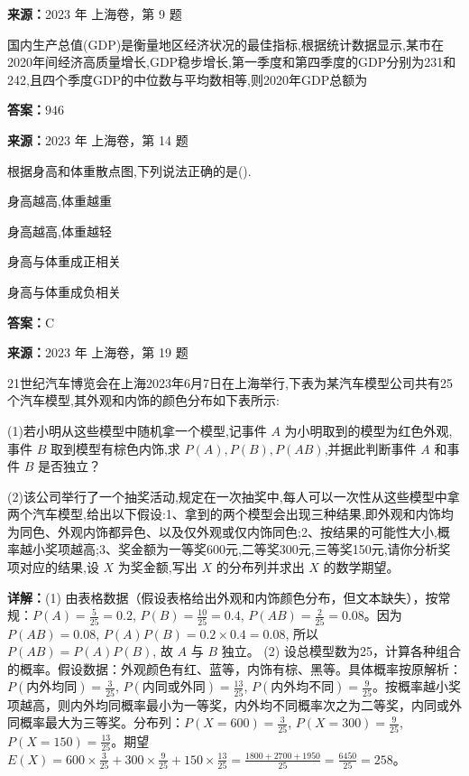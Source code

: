 \begin{question}[points=5]
\textbf{来源：}2023 年 上海卷，第 9 题\par
国内生产总值(GDP)是衡量地区经济状况的最佳指标,根据统计数据显示,某市在2020年间经济高质量增长,GDP稳步增长,第一季度和第四季度的GDP分别为231和242,且四个季度GDP的中位数与平均数相等,则2020年GDP总额为
\fillin[{$946$}]
\begin{solution}
\textbf{答案：}$946$
\end{solution}
\end{question}

\begin{question}[points=4]
\textbf{来源：}2023 年 上海卷，第 14 题\par
根据身高和体重散点图,下列说法正确的是().
\begin{choices}
  \item 身高越高,体重越重
  \item 身高越高,体重越轻
  \item 身高与体重成正相关
  \item 身高与体重成负相关
\end{choices}
\begin{solution}
\textbf{答案：}C
\end{solution}
\end{question}

\begin{question}[points=14]
\textbf{来源：}2023 年 上海卷，第 19 题\par
21世纪汽车博览会在上海2023年6月7日在上海举行,下表为某汽车模型公司共有25个汽车模型,其外观和内饰的颜色分布如下表所示:

(1)若小明从这些模型中随机拿一个模型,记事件 $A$ 为小明取到的模型为红色外观,事件 $B$ 取到模型有棕色内饰,求 $P(A),P(B),P(AB)$,并据此判断事件 $A$ 和事件 $B$ 是否独立？

(2)该公司举行了一个抽奖活动,规定在一次抽奖中,每人可以一次性从这些模型中拿两个汽车模型,给出以下假设:1、拿到的两个模型会出现三种结果,即外观和内饰均为同色、外观内饰都异色、以及仅外观或仅内饰同色;2、按结果的可能性大小,概率越小奖项越高;3、奖金额为一等奖600元,二等奖300元,三等奖150元,请你分析奖项对应的结果,设 $X$ 为奖金额,写出 $X$ 的分布列并求出 $X$ 的数学期望。
\begin{solution}

\textbf{详解：}(1) 由表格数据（假设表格给出外观和内饰颜色分布，但文本缺失），按常规：$P(A)=\frac{5}{25}=0.2$, $P(B)=\frac{10}{25}=0.4$, $P(AB)=\frac{2}{25}=0.08$。因为 $P(AB)=0.08$, $P(A)P(B)=0.2\times0.4=0.08$, 所以 $P(AB)=P(A)P(B)$, 故 $A$ 与 $B$ 独立。
(2) 设总模型数为25，计算各种组合的概率。假设数据：外观颜色有红、蓝等，内饰有棕、黑等。具体概率按原解析：$P(\text{内外均同})=\frac{3}{25}$, $P(\text{内同或外同})=\frac{13}{25}$, $P(\text{内外均不同})=\frac{9}{25}$。按概率越小奖项越高，则内外均同概率最小为一等奖，内外均不同概率次之为二等奖，内同或外同概率最大为三等奖。分布列：$P(X=600)=\frac{3}{25}$, $P(X=300)=\frac{9}{25}$, $P(X=150)=\frac{13}{25}$。期望 $E(X)=600\times\frac{3}{25}+300\times\frac{9}{25}+150\times\frac{13}{25}=\frac{1800+2700+1950}{25}=\frac{6450}{25}=258$。
\end{solution}
\end{question}

